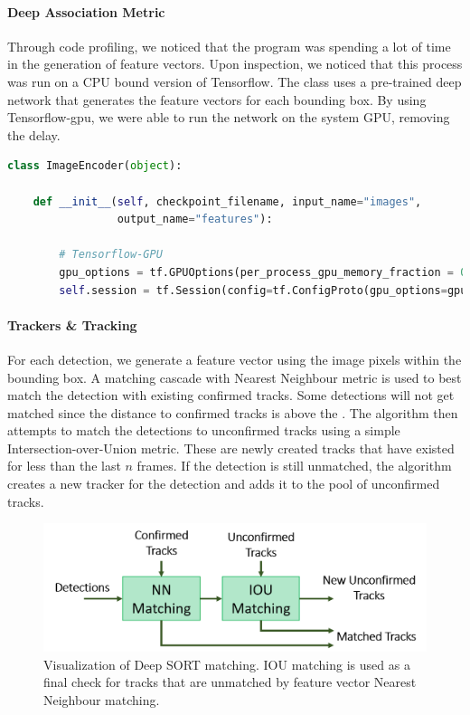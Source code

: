 \paragraph{Deep Association Metric} Through code profiling, we noticed that the program was spending a lot of time in the generation of feature vectors. Upon inspection, we noticed that this process was run on a CPU bound version of Tensorflow. The  class uses a pre-trained deep network that generates the feature vectors for each bounding box. By using Tensorflow-gpu, we were able to run the network on the system GPU, removing the delay. \\

\begin{lstlisting}[language=Python, caption={Deep SORT Tensorflow GPU modifications}]
class ImageEncoder(object):

    def __init__(self, checkpoint_filename, input_name="images",
                 output_name="features"):
                 
        # Tensorflow-GPU
        gpu_options = tf.GPUOptions(per_process_gpu_memory_fraction = 0.2)
        self.session = tf.Session(config=tf.ConfigProto(gpu_options=gpu_options))
\end{lstlisting}

\paragraph{Trackers \& Tracking} For each detection, we generate a feature vector using the image pixels within the bounding box. A matching cascade with Nearest Neighbour metric is used to best match the detection with existing confirmed tracks. Some detections will not get matched since the distance to confirmed tracks is above the . The algorithm then attempts to match the detections to unconfirmed tracks using a simple Intersection-over-Union metric. These are newly created tracks that have existed for less than the last $n$ frames. If the detection is still unmatched, the algorithm creates a new tracker for the detection and adds it to the pool of unconfirmed tracks.

\begin{figure}[ht]
    \centering
    \includegraphics[width=0.8\linewidth]{img/chapter5_implementation/deepSortMatching.png}
    \caption{Visualization of Deep SORT matching. IOU matching is used as a final check for tracks that are unmatched by feature vector Nearest Neighbour matching.}
    \label{fig:deepSortMatch}
\end{figure}

